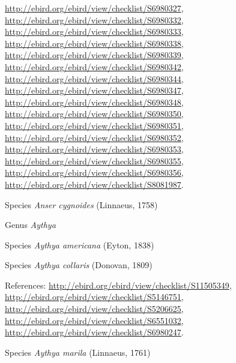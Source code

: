 \documentclass[9pt, article]{memoir}
\begin{document}
\begin{multicols}{2}
\url{http://ebird.org/ebird/view/checklist/S6980327}, 
\url{http://ebird.org/ebird/view/checklist/S6980332}, 
\url{http://ebird.org/ebird/view/checklist/S6980333}, 
\url{http://ebird.org/ebird/view/checklist/S6980338}, 
\url{http://ebird.org/ebird/view/checklist/S6980339}, 
\url{http://ebird.org/ebird/view/checklist/S6980342}, 
\url{http://ebird.org/ebird/view/checklist/S6980344}, 
\url{http://ebird.org/ebird/view/checklist/S6980347}, 
\url{http://ebird.org/ebird/view/checklist/S6980348}, 
\url{http://ebird.org/ebird/view/checklist/S6980350}, 
\url{http://ebird.org/ebird/view/checklist/S6980351}, 
\url{http://ebird.org/ebird/view/checklist/S6980352}, 
\url{http://ebird.org/ebird/view/checklist/S6980353}, 
\url{http://ebird.org/ebird/view/checklist/S6980355}, 
\url{http://ebird.org/ebird/view/checklist/S6980356}, 
\url{http://ebird.org/ebird/view/checklist/S8081987}.

\vspace{6pt}\noindent\hspace{36pt}Species \textit{Anser cygnoides} (Linnaeus, 1758)


\vspace{6pt}\noindent\hspace{30pt}Genus \textit{Aythya}


\vspace{6pt}\noindent\hspace{36pt}Species \textit{Aythya americana} (Eyton, 1838)


\vspace{6pt}\noindent\hspace{36pt}Species \textit{Aythya collaris} (Donovan, 1809)


\vspace{6pt}References: 
\url{http://ebird.org/ebird/view/checklist/S11505349}, 
\url{http://ebird.org/ebird/view/checklist/S5146751}, 
\url{http://ebird.org/ebird/view/checklist/S5206625}, 
\url{http://ebird.org/ebird/view/checklist/S6551032}, 
\url{http://ebird.org/ebird/view/checklist/S6980247}.

\vspace{6pt}\noindent\hspace{36pt}Species \textit{Aythya marila} (Linnaeus, 1761)



\end{multicols}
\end{document}
